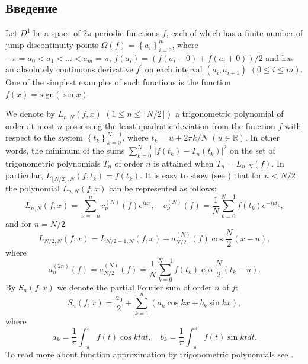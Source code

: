 \subsection{Введение}
Let $D^1$ be a space of $2\pi$-periodic functions $f$, each of which has a finite number of jump discontinuity points $\Omega(f) = \left\{a_i\right\}_{i=0}^m$, where $-\pi = a_0 < a_1 < \ldots < a_m = \pi$, $f(a_i) = (f(a_i - 0) + f(a_i + 0)) / 2$
and has an absolutely continuous derivative $f^{'}$ on each interval $(a_i,a_{i+1})$ $(0\leq i \leq m)$. One of the simplest examples of such functions 
is the function $f(x) = \mbox{sign} (\sin x)$.

We denote by $L_{n,N}(f,x)$ $(1 \leq n \leq \lfloor N/2 \rfloor)$ a trigonometric polynomial of order at most $n$ possessing the least quadratic deviation from the function $f$ with
respect to the system $\left\{t_k\right\}_{k=0}^{N-1}$, where $t_k = u + 2\pi k / N$ $(u \in \mathbb{R})$. 
In other words, the minimum of the sums $\sum_{k=0}^{N-1} \left|f(t_k) - T_n(t_k)\right|^2$ on the set of trigonometric polynomials $T_n$ of order $n$ is attained when
$T_n = L_{n,N}(f)$. In particular, $L_{\lfloor N/2\rfloor, N}(f,t_k) = f(t_k)$. It is easy to show (see \cite{shii-1983}) that for $n < N/2$ the polynomial $L_{n,N}(f,x)$ can be 
represented as follows:
\[
L_{n,N}(f,x)=\sum\limits _{\nu=-n}^{n}c_{\nu}^{(N)}(f)e^{i\nu x},\quad c_{\nu}^{(N)}(f)=\frac{1}{N}\sum\limits _{k=0}^{N-1}f(t_{k})e^{-i\nu t_{k}},
\]
and for $n=N/2$ 
\begin{equation}
L_{N/2,N}(f,x)=L_{N/2-1,N}(f,x)+a_{N/2}^{(N)}(f)\cos \frac{N}{2}(x-u),\label{eq:L=00003DL+a}
\end{equation}
where
\begin{equation} \label{an_formula}
a_n^{(2n)}(f) = a_{N/2}^{(N)}(f)=\frac{1}{N}\sum\limits_{k=0}^{N-1}f(t_{k})\cos \frac{N}{2}(t_{k} - u).
\end{equation}
By $S_n(f,x)$ we denote the partial Fourier sum of order $n$ of  $f$:
\begin{equation*}
S_n(f,x) = \frac{a_0}{2} + \sum_{k=1}^{n} \left(a_k \cos kx + b_k \sin kx\right),
\end{equation*}
where
\begin{equation*}
a_k = \frac{1}{\pi} \int_{-\pi}^{\pi} f(t) \cos kt dt, \quad b_k = \frac{1}{\pi} \int_{-\pi}^{\pi} f(t) \sin kt dt.
\end{equation*}
To read more about function approximation by trigonometric polynomials see 
\cite{2_bernstein,4_erdos,7_kalashnikov,8_krilov,9_marcinkiewicz,10_marcinkiewicz,11_natanson,12_nikolsky,18_zigmund}.

